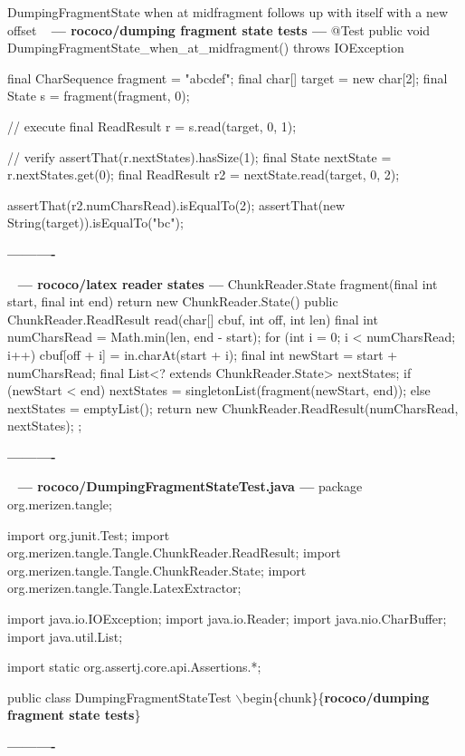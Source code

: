\documentclass{book}
\newenvironment{chunk}[1]{%
{\ }\newline\noindent%
\hbox{\hskip 2.0cm}{\bf --- #1 ---}%
\verbatim}%                               say exactly what we see
{\endverbatim%
\par{}%
\noindent{}%
\hbox{\hskip 2.0cm}{\bf ----------}%
\par%
\normalsize\noindent}%
\providecommand{\getchunk}[1]{%
\noindent%
{\small $\backslash{}$begin\{chunk\}\{{\bf #1}\}}%
\index{{#1}}}
\begin{document}
DumpingFragmentState when at midfragment follows up with itself with a new offset
\begin{chunk}{rococo/dumping fragment state tests}
@Test
public void DumpingFragmentState_when_at_midfragment() throws IOException {
    final CharSequence fragment = "abcdef";
    final char[] target = new char[2];
    final State s = fragment(fragment, 0);

    // execute
    final ReadResult r = s.read(target, 0, 1);

    // verify
    assertThat(r.nextStates).hasSize(1);
    final State nextState = r.nextStates.get(0);
    final ReadResult r2 = nextState.read(target, 0, 2);

    assertThat(r2.numCharsRead).isEqualTo(2);
    assertThat(new String(target)).isEqualTo("bc");
}
\end{chunk}

\begin{chunk}{rococo/latex reader states}
ChunkReader.State fragment(final int start, final int end) {
    return new ChunkReader.State() {
        public ChunkReader.ReadResult read(char[] cbuf, int off, int len) {
            final int numCharsRead = Math.min(len, end - start);
            for (int i = 0; i < numCharsRead; i++) {
                cbuf[off + i] = in.charAt(start + i);
            }
            final int newStart = start + numCharsRead;
            final List<? extends ChunkReader.State> nextStates;
            if (newStart < end) {
                nextStates = singletonList(fragment(newStart, end));
            } else {
                nextStates = emptyList();
            }
            return new ChunkReader.ReadResult(numCharsRead, nextStates);
        }
    };
}
\end{chunk}

\begin{chunk}{rococo/DumpingFragmentStateTest.java}
package org.merizen.tangle;

import org.junit.Test;
import org.merizen.tangle.Tangle.ChunkReader.ReadResult;
import org.merizen.tangle.Tangle.ChunkReader.State;
import org.merizen.tangle.Tangle.LatexExtractor;

import java.io.IOException;
import java.io.Reader;
import java.nio.CharBuffer;
import java.util.List;

import static org.assertj.core.api.Assertions.*;

public class DumpingFragmentStateTest {
\getchunk{rococo/dumping fragment state tests}
}
\end{chunk}
\end{document}
